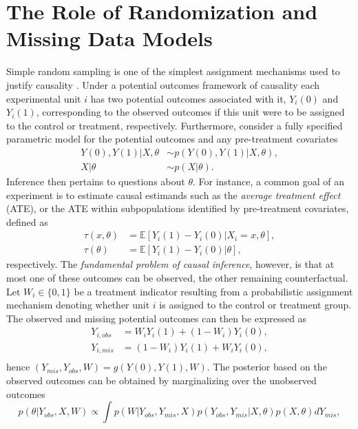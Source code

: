 \documentclass[11pt]{article}
\begin{document}
\section{The Role of Randomization and Missing Data Models}
\label{sec:causal_models}
Simple random sampling is one of the simplest assignment mechanisms used to justify causality . Under a potential outcomes framework of causality each experimental unit $i$ has two potential outcomes associated with it, $Y_i(0)$ and $Y_i(1)$, corresponding to the observed outcomes if this unit were to be assigned to the control or treatment, respectively. Furthermore, consider a fully specified parametric model for the potential outcomes and any pre-treatment covariates
\begin{align*}
  Y(0),Y(1)|X,\theta &\sim p (Y(0),Y(1)|X,\theta),\\
    X|\theta &\sim p (X|\theta).
\end{align*}
Inference then pertains to questions about $\theta$. For instance, a common goal of an experiment is to estimate causal estimands such as the \textit{average treatment effect} (ATE), or the ATE within subpopulations identified by pre-treatment covariates, defined as
\begin{align*}
  \tau(x,\theta) &= \mathbb{E}[Y_i(1)-Y_i(0)|X_i=x, \theta],\\
  \tau(\theta) &= \mathbb{E}[Y_i(1)-Y_i(0)|\theta],
\end{align*}
respectively. 
The \textit{fundamental problem of causal inference}, however, is that at most one of these outcomes can be observed, the other remaining counterfactual.
Let $W_i\in \lbrace 0,1 \rbrace$ be a treatment indicator resulting from a probabilistic assignment mechanism denoting whether unit $i$ is assigned to the control or treatment group. The observed and missing potential outcomes can then be expressed as
\begin{align*}
  Y_{i,obs} &= W_iY_i(1)+(1-W_i)Y_i(0),\\
  Y_{i,mis} &= (1-W_i)Y_i(1)+W_iY_i(0),\\
\end{align*}
hence $(Y_{mis}, Y_{obs},W) = g(Y(0),Y(1), W)$.
The posterior based on the observed outcomes can be obtained by marginalizing over the unobserved outcomes
\begin{equation}
  \label{eq:full_likelihood}
  p(\theta|Y_{obs}, X, W) \propto \int p(W|Y_{obs},Y_{mis},X) p(Y_{obs},Y_{mis}|X, \theta) p(X,\theta) dY_{mis},
\end{equation}
\end{document}

